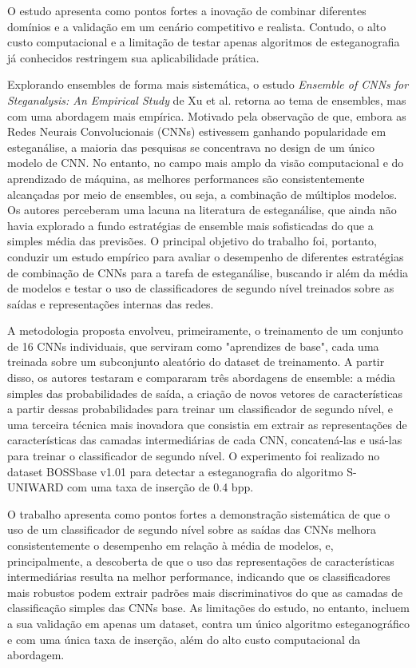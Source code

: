\documentclass[12pt]{article}
\begin{document}
O estudo apresenta como pontos fortes a inovação de combinar diferentes
domínios e a validação em um cenário competitivo e realista. Contudo, o alto
custo computacional e a limitação de testar apenas algoritmos de esteganografia
já conhecidos restringem sua aplicabilidade prática.


Explorando ensembles de forma mais sistemática, o estudo \textit{Ensemble of
  CNNs for Steganalysis: An Empirical Study} de Xu et al. \cite{xu2016ensemble}
retorna ao tema de ensembles, mas com uma abordagem mais empírica. Motivado
pela observação de que, embora as Redes Neurais Convolucionais (CNNs)
estivessem ganhando popularidade em esteganálise, a maioria das pesquisas se
concentrava no design de um único modelo de CNN. No entanto, no campo mais
amplo da visão computacional e do aprendizado de máquina, as melhores
performances são consistentemente alcançadas por meio de ensembles, ou seja, a
combinação de múltiplos modelos. Os autores perceberam uma lacuna na literatura
de esteganálise, que ainda não havia explorado a fundo estratégias de ensemble
mais sofisticadas do que a simples média das previsões. O principal objetivo do
trabalho foi, portanto, conduzir um estudo empírico para avaliar o desempenho
de diferentes estratégias de combinação de CNNs para a tarefa de esteganálise,
buscando ir além da média de modelos e testar o uso de classificadores de
segundo nível treinados sobre as saídas e representações internas das redes.

A metodologia proposta envolveu, primeiramente, o treinamento de um conjunto de
16 CNNs individuais, que serviram como "aprendizes de base", cada uma treinada
sobre um subconjunto aleatório do dataset de treinamento. A partir disso, os
autores testaram e compararam três abordagens de ensemble: a média simples das
probabilidades de saída, a criação de novos vetores de características a partir
dessas probabilidades para treinar um classificador de segundo nível, e uma
terceira técnica mais inovadora que consistia em extrair as representações de
características das camadas intermediárias de cada CNN, concatená-las e usá-las
para treinar o classificador de segundo nível. O experimento foi realizado no
dataset BOSSbase v1.01 para detectar a esteganografia do algoritmo S-UNIWARD
com uma taxa de inserção de 0.4 bpp.

O trabalho apresenta como pontos fortes a demonstração sistemática de que o uso
de um classificador de segundo nível sobre as saídas das CNNs melhora
consistentemente o desempenho em relação à média de modelos, e, principalmente,
a descoberta de que o uso das representações de características intermediárias
resulta na melhor performance, indicando que os classificadores mais robustos
podem extrair padrões mais discriminativos do que as camadas de classificação
simples das CNNs base. As limitações do estudo, no entanto, incluem a sua
validação em apenas um dataset, contra um único algoritmo esteganográfico e com
uma única taxa de inserção, além do alto custo computacional da abordagem.
\end{document}
